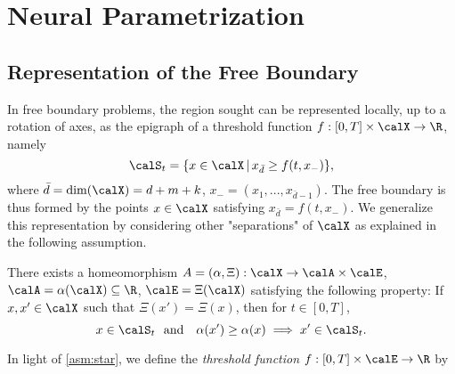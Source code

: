 \section{Neural Parametrization}

\subsection{Representation of the Free Boundary}

In free boundary problems, %
the region sought can be represented locally, up to a rotation of axes, as the epigraph of a threshold function $f: [0,T]\times \calX \to \R$, namely
$$\calS_t = \{x\in \calX \,|\, x_{\bar{d}} \ge f(t,x_{-})\},$$
where $\bar{d}= \text{dim}(\calX)= d+m+k$,  $x_{-}=(x_1,...,x_{\bar{d}-1})$.
The free boundary is thus formed by the points $x\in \calX$ satisfying  $x_{\bar{d}} = f(t,x_{-})$. We generalize this representation by considering other "separations" of $\calX$ as explained in the following assumption. %

\begin{asm}
\label{asm:star}
There exists a homeomorphism $A=(\alpha,\Xi) : \calX  \to \calA \times \calE$, $\calA = \alpha(\calX) \subseteq \R$, $\calE = \Xi(\calX)$  
satisfying the following property: If $x,x' \in \calX$ such that  $\Xi(x')=\Xi(x)$, then for $t\in [0,T]$,%
\begin{equation*}
   x \in \calS_t \ \textnormal{ and } \ \ \alpha(x') \ge \alpha(x)  \; \Longrightarrow  \;
x' \in \calS_t.
\end{equation*}
\end{asm} 

In light of \cref{asm:star},  we define the \textit{threshold function} $
f: [0,T]\times \calE \to \R$  by 

